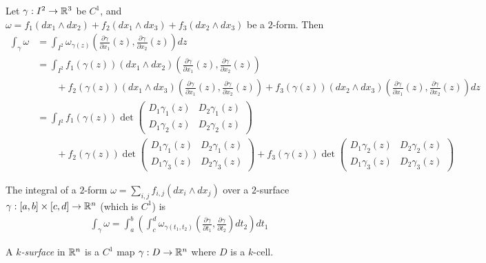 \documentclass[11pt]{article}
\begin{document}
\begin{definition} Let $\gamma : I^2 \to \mathbb{R}^3$ be $C^1$, and $\omega = f_1 (dx_1 \wedge dx_2) + f_2 (dx_1 \wedge dx_3) + f_3 (dx_2 \wedge dx_3)$ be a $2$-form. Then \begin{align*} \int_{\gamma} \omega & = \int_{I^2} \omega_{\gamma(z)} \left( \frac{\partial \gamma}{\partial x_1}(z), \frac{\partial \gamma}{\partial x_2} (z) \right) dz \\ & = \int_{I^2}  f_1(\gamma (z)) (dx_1 \wedge dx_2) \left( \frac{\partial \gamma}{\partial x_1}(z), \frac{\partial \gamma}{\partial x_2} (z) \right) \\ & \qquad + f_2(\gamma(z))(dx_1 \wedge dx_3) \left( \frac{\partial \gamma}{\partial x_1}(z), \frac{\partial \gamma}{\partial x_2} (z) \right) + f_3 (\gamma (z)) (dx_2 \wedge dx_3) \left( \frac{\partial \gamma}{\partial x_1}(z), \frac{\partial \gamma}{\partial x_2} (z) \right) dz \\ & = \int_{I^2} f_1(\gamma(z)) \det \begin{pmatrix} D_1\gamma_1(z) & D_2 \gamma_1 (z) \\ D_1 \gamma_2(z) & D_2 \gamma_2(z) \end{pmatrix}\\ & \qquad +  f_2 (\gamma(z)) \det \begin{pmatrix} D_1\gamma_1(z) & D_2 \gamma_1 (z) \\ D_1 \gamma_3(z) & D_2 \gamma_3(z) \end{pmatrix} +  f_3(\gamma(z)) \det \begin{pmatrix} D_1\gamma_2(z) & D_2 \gamma_2 (z) \\ D_1 \gamma_3(z) & D_2 \gamma_3(z) \end{pmatrix} \end{align*}
\end{definition}

\begin{definition} The integral of a $2$-form $\omega = \sum_{i, j} f_{i, j} (dx_i \wedge dx_j)$ over a $2$-surface $\gamma : [a, b] \times [c, d] \to \mathbb{R}^n$ (which is $C^1$) is \begin{align*} \int_{\gamma} \omega = \int_a^b \left( \int_c^d \omega_{\gamma(t_1, t_2)} \left( \frac{\partial \gamma}{\partial t_1}, \frac{\partial \gamma}{\partial t_2} \right)  dt_2 \right) dt_1 \end{align*}
\end{definition}

\begin{definition} A \emph{$k$-surface} in $\mathbb{R}^n$ is a $C^1$ map $\gamma: D \to \mathbb{R}^n$ where $D$ is a $k$-cell.
\end{definition}
\end{document}
